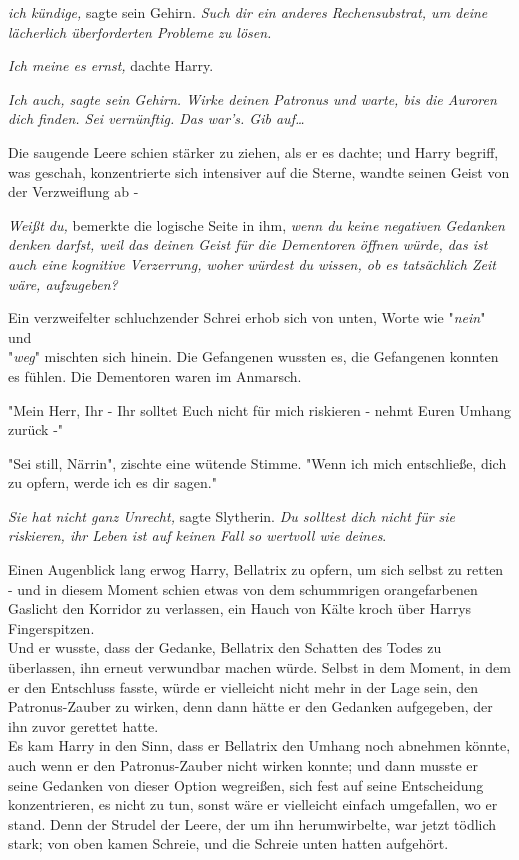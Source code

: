 {\emph{ich kündige,} sagte sein Gehirn. \emph{Such dir ein anderes Rechensubstrat, um deine lächerlich überforderten Probleme zu lösen.}

\emph{Ich meine es ernst,} dachte Harry.

\emph{Ich auch, sagte sein Gehirn. Wirke deinen Patronus und warte, bis die Auroren dich finden. Sei vernünftig. Das war's. Gib auf…}

Die saugende Leere schien stärker zu ziehen, als er es dachte; und Harry begriff, was geschah, konzentrierte sich intensiver auf die Sterne, wandte seinen Geist von der Verzweiflung ab -

\emph{Weißt du,} bemerkte die logische Seite in ihm, \emph{wenn du keine negativen Gedanken denken darfst, weil das deinen Geist für die Dementoren öffnen würde, das ist auch eine kognitive Verzerrung, woher würdest du wissen, ob es tatsächlich Zeit wäre, aufzugeben?}

Ein verzweifelter schluchzender Schrei erhob sich von unten, Worte wie "\emph{nein}" und\\ "\emph{weg}" mischten sich hinein. Die Gefangenen wussten es, die Gefangenen konnten es fühlen. Die Dementoren waren im Anmarsch.

"Mein Herr, Ihr - Ihr solltet Euch nicht für mich riskieren - nehmt Euren Umhang zurück -"

"Sei still, Närrin", zischte eine wütende Stimme. "Wenn ich mich entschließe, dich zu opfern, werde ich es dir sagen."

\emph{Sie hat nicht ganz Unrecht,} sagte Slytherin. \emph{Du solltest dich nicht für sie riskieren, ihr Leben ist auf keinen Fall so wertvoll wie deines}.

Einen Augenblick lang erwog Harry, Bellatrix zu opfern, um sich selbst zu retten - und in diesem Moment schien etwas von dem schummrigen orangefarbenen Gaslicht den Korridor zu verlassen, ein Hauch von Kälte kroch über Harrys Fingerspitzen.\\ Und er wusste, dass der Gedanke, Bellatrix den Schatten des Todes zu überlassen, ihn erneut verwundbar machen würde. Selbst in dem Moment, in dem er den Entschluss fasste, würde er vielleicht nicht mehr in der Lage sein, den Patronus-Zauber zu wirken, denn dann hätte er den Gedanken aufgegeben, der ihn zuvor gerettet hatte.\\ Es kam Harry in den Sinn, dass er Bellatrix den Umhang noch abnehmen könnte, auch wenn er den Patronus-Zauber nicht wirken konnte; und dann musste er seine Gedanken von dieser Option wegreißen, sich fest auf seine Entscheidung konzentrieren, es nicht zu tun, sonst wäre er vielleicht einfach umgefallen, wo er stand. Denn der Strudel der Leere, der um ihn herumwirbelte, war jetzt tödlich stark; von oben kamen Schreie, und die Schreie unten hatten aufgehört.

}
